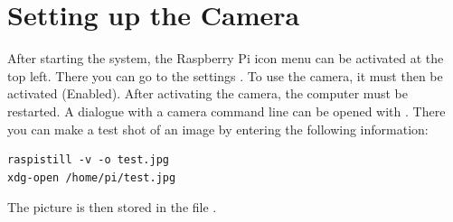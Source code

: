 %
%
%





\section{Setting up the Camera}

After starting the system, the Raspberry Pi icon menu can be activated at the top left. There you can go to the settings . To use the camera, it must then be activated (Enabled). After activating the camera, the computer must be restarted. A dialogue with a camera command line can be opened with . There you can make a test shot of an image by entering the following information:

\begin{lstlisting}
raspistill -v -o test.jpg
xdg-open /home/pi/test.jpg
\end{lstlisting}

The picture is then stored in the file .



